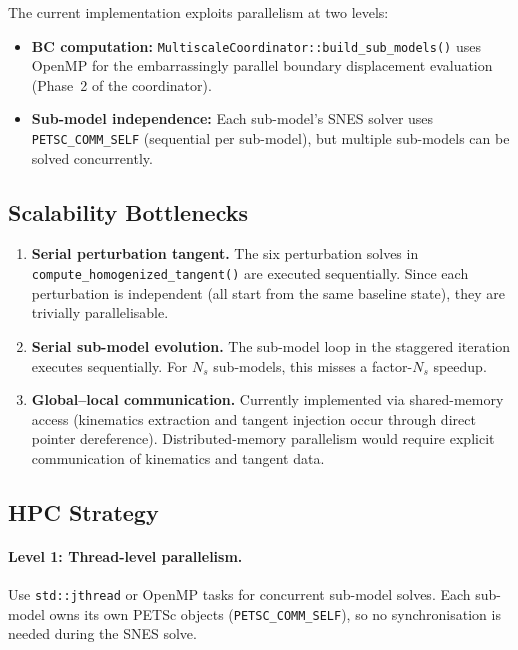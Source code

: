 The current implementation exploits parallelism at two levels:
\begin{itemize}
  \item \textbf{BC computation:}
    \texttt{MultiscaleCoordinator::build\_sub\_models()} uses OpenMP
    for the embarrassingly parallel boundary displacement evaluation
    (Phase~2 of the coordinator).

  \item \textbf{Sub-model independence:}  Each sub-model's SNES solver
    uses \texttt{PETSC\_COMM\_SELF} (sequential per sub-model), but
    multiple sub-models can be solved concurrently.
\end{itemize}

\subsection{Scalability Bottlenecks}

\begin{enumerate}
  \item \textbf{Serial perturbation tangent.}
    The six perturbation solves in
    \texttt{compute\_homogenized\_tangent()} are executed
    sequentially.  Since each perturbation is independent (all start
    from the same baseline state), they are trivially parallelisable.

  \item \textbf{Serial sub-model evolution.}
    The sub-model loop in the staggered iteration executes
    sequentially.  For $N_s$ sub-models, this misses a factor-$N_s$
    speedup.

  \item \textbf{Global--local communication.}
    Currently implemented via shared-memory access (kinematics
    extraction and tangent injection occur through direct pointer
    dereference).  Distributed-memory parallelism would require
    explicit communication of kinematics and tangent data.
\end{enumerate}

\subsection{HPC Strategy}

\paragraph{Level 1: Thread-level parallelism.}
Use \texttt{std::jthread} or OpenMP tasks for concurrent sub-model
solves.  Each sub-model owns its own PETSc objects
(\texttt{PETSC\_COMM\_SELF}), so no synchronisation is needed
during the SNES solve.

